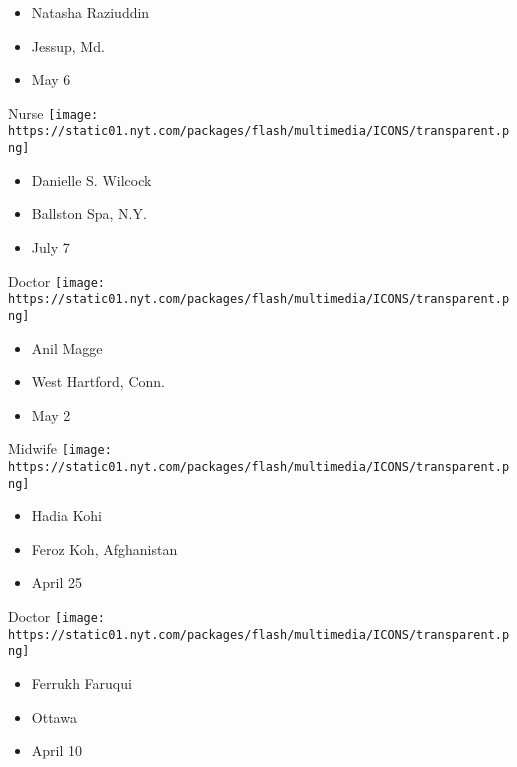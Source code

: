 \begin{itemize}
\tightlist
\item
  Natasha Raziuddin
\item
  Jessup, Md.
\item
  May 6
\end{itemize}

\protect\hyperlink{item-danielle-s-wilcock}{}

Nurse
\texttt{[image: https://static01.nyt.com/packages/flash/multimedia/ICONS/transparent.png]}

\begin{itemize}
\tightlist
\item
  Danielle S. Wilcock
\item
  Ballston Spa, N.Y.
\item
  July 7
\end{itemize}

\protect\hyperlink{item-anil-magge}{}

Doctor
\texttt{[image: https://static01.nyt.com/packages/flash/multimedia/ICONS/transparent.png]}

\begin{itemize}
\tightlist
\item
  Anil Magge
\item
  West Hartford, Conn.
\item
  May 2
\end{itemize}

\protect\hyperlink{item-hadia-kohi}{}

Midwife
\texttt{[image: https://static01.nyt.com/packages/flash/multimedia/ICONS/transparent.png]}

\begin{itemize}
\tightlist
\item
  Hadia Kohi
\item
  Feroz Koh, Afghanistan
\item
  April 25
\end{itemize}

\protect\hyperlink{item-ferrukh-faruqui}{}

Doctor
\texttt{[image: https://static01.nyt.com/packages/flash/multimedia/ICONS/transparent.png]}

\begin{itemize}
\tightlist
\item
  Ferrukh Faruqui
\item
  Ottawa
\item
  April 10
\end{itemize}

